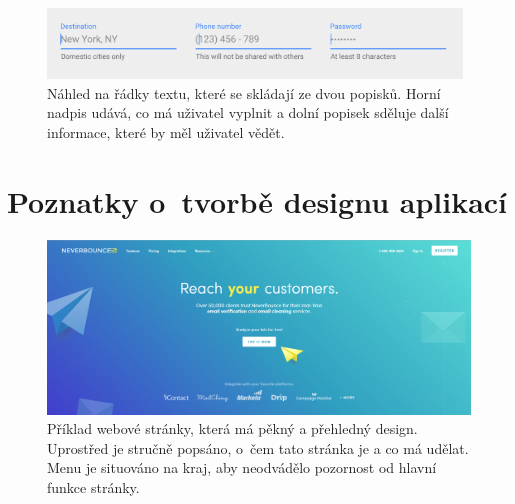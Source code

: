 \begin{figure}[H]
\centering
\includegraphics[width= 11cm]{obrazky-figures/description}
\caption{Náhled na řádky textu, které se skládají ze dvou popisků. Horní nadpis udává, co má uživatel vyplnit a dolní popisek sděluje další informace, které by měl uživatel vědět.}
\label{desc}
\end{figure}

\section{Poznatky o~tvorbě designu aplikací}

\begin{figure}[H]
\centering
\includegraphics[width= 15cm]{obrazky-figures/good_design}
\caption{Příklad webové stránky, která má pěkný a přehledný design. Uprostřed je stručně popsáno, o~čem tato stránka je a co má udělat. Menu je situováno na kraj, aby neodvádělo pozornost od hlavní funkce stránky.}
\label{good}
\end{figure}

